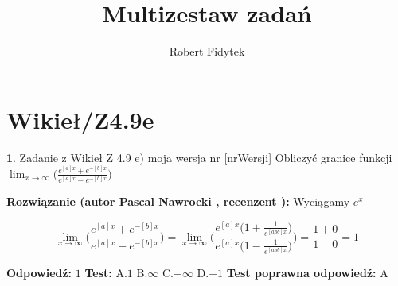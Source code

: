 \documentclass[12pt, a4paper]{article}
\title{Multizestaw zadań}
\author{Robert Fidytek}
\date{}
\theoremstyle{definition} %
\newtheorem{zad}{}
\newcommand{\kategoria}[1]{\section{#1}} %
\newcommand{\zadStart}[1]{\begin{zad}#1\newline} %
\newcommand{\zadStop}{\end{zad}}   %
\newcommand{\rozwStart}[2]{\noindent \textbf{Rozwiązanie (autor #1 , recenzent #2): }\newline} %
\newcommand{\odpStart}{\noindent \textbf{Odpowiedź:}\newline}    %
\newcommand{\odpStop}{\newline}                                             %
\newcommand{\testStart}{\noindent \textbf{Test:}\newline} %
\newcommand{\testStop}{\newline} %
\newcommand{\kluczStart}{\noindent \textbf{Test poprawna odpowiedź:}\newline} %
\newcommand{\kluczStop}{\newline} %
\begin{document}
\maketitle


\kategoria{Wikieł/Z4.9e}
\zadStart{Zadanie z Wikieł Z 4.9 e) moja wersja nr [nrWersji]}
Obliczyć granice funkcji $\displaystyle{\lim_{x \to \infty}}\bigg(\frac{e^{[a]x}+e^{-[b]x}}{e^{[a]x}-e^{-[b]x}}\bigg)$
\zadStop
\rozwStart{Pascal Nawrocki}{}
Wyciągamy $e^x$

$$\displaystyle{\lim_{x \to \infty}}\bigg(\frac{e^{[a]x}+e^{-[b]x}}{e^{[a]x}-e^{-[b]x}}\bigg)=\displaystyle{\lim_{x \to \infty}}\bigg(\frac{e^{[a]x}\big(1+\frac{1}{e^{[apb]x}}\big)}{e^{[a]x}\big(1-\frac{1}{e^{[apb]x}}\big)}\bigg)=\frac{1+0}{1-0}=1$$

\odpStart
$1$
\odpStop
\testStart
A.$1$
B.$\infty$
C.$-\infty$
D.$-1$
\testStop
\kluczStart
A
\kluczStop
\end{document}
